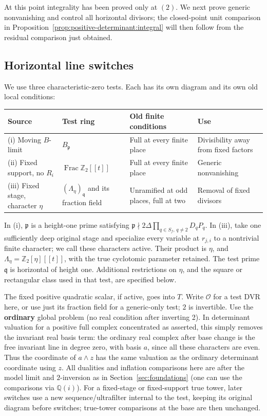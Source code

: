 At this point integrality has been proved only at \((2)\). We next prove
generic nonvanishing and control all horizontal divisors; the closed-point
unit comparison in Proposition~\ref{prop:positive-determinant:integral} will
then follow from the residual comparison just obtained.


\subsection{Horizontal line switches}\label{subsec:positive-determinant:horizontal}

We use three characteristic-zero tests. Each has its own diagram and
its own old local conditions:
\begin{center}
\small
\begin{tabular}{@{}p{}p{}p{}p{}@{}}
\toprule
Source & Test ring & Old finite conditions & Use \\
\midrule
(i) Moving \(B\)-limit & \(B_{\mathfrak p}\) & Full at every finite place &
Divisibility away from fixed factors \\[3pt]
(ii) Fixed support, no \(R_i\) & \(\operatorname{Frac}\mathbb Z_2[[t]]\) &
Full at every finite place & Generic nonvanishing \\[3pt]
(iii) Fixed stage, character \(\eta\) &
\((\Lambda_\eta)_{\mathfrak q}\) and its fraction field &
Unramified at odd places, full at two & Removal of fixed divisors \\
\bottomrule
\end{tabular}
\end{center}
In (i), \(\mathfrak p\) is a height-one prime satisfying
\(\mathfrak p\nmid2\Delta\prod_{q\in S_f,\,q\ne2}D_qP_q\).
In (iii), take one sufficiently deep original stage and specialize every
variable at \(r_{j,i}\) to a nontrivial finite character; we call these
characters active. Their product is \(\eta\), and
\(\Lambda_\eta=\mathbb Z_2[\eta][[t]]\), with the true cyclotomic parameter
retained. The test prime \(\mathfrak q\) is horizontal of height one. Additional
restrictions on \(\eta\), and the square or rectangular class used in
that test, are specified below.

The fixed positive quadratic scalar, if active, goes into \(T\). Write \(\mathscr O\) for a test DVR here, or use just its fraction field for a generic-only test; \(2\) is invertible. Use the \textbf{ordinary} global problem (no real condition after inverting 2). In determinant valuation for a positive full complex concentrated as asserted, this simply removes the invariant real basis term: the ordinary real complex after base change is the free invariant line in degree zero, with basis \(a\), since all these characters are even. Thus the coordinate of \(a\wedge z\) has the same valuation as the ordinary determinant coordinate using \(z\). All dualities and inflation comparisons here are after the model limit and \(2\)-inversion as in Section~\ref{sec:foundations} (one can use the comparisons via \(\mathbb Q(i)\)). For a fixed-stage or fixed-support true tower, later switches use a new sequence/ultrafilter internal to the test, keeping its original diagram before switches; true-tower comparisons at the base are then unchanged.

